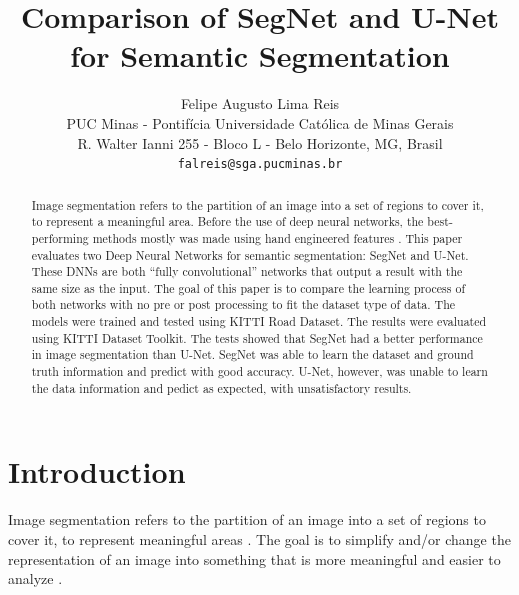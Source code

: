 \documentclass[10pt,twocolumn,letterpaper]{article}
\begin{document}
\title{Comparison of SegNet and U-Net for Semantic Segmentation}

\author{Felipe Augusto Lima Reis\\
PUC Minas - Pontif\'icia Universidade Cat\'olica de Minas Gerais\\
R. Walter Ianni 255 - Bloco L - Belo Horizonte, MG, Brasil\\
{\tt\small falreis@sga.pucminas.br}
}

\maketitle


\begin{abstract}
    Image segmentation refers to the partition of an image into a set of regions to cover it, to represent a meaningful area. Before the use of deep neural networks, the best-performing methods mostly was made using hand engineered features \cite{SEGNET}. This paper evaluates two Deep Neural Networks for semantic segmentation: SegNet and U-Net. These DNNs are both ``fully convolutional'' networks that output a result with the same size as the input. The goal of this paper is to compare the learning process of both networks with no pre or post processing to fit the dataset type of data. The models were trained and tested using KITTI Road Dataset. The results were evaluated using KITTI Dataset Toolkit. The tests showed that SegNet had a better performance in image segmentation than U-Net. SegNet was able to learn the dataset and ground truth information and predict with good accuracy. U-Net, however, was unable to learn the data information and pedict as expected, with unsatisfactory results.
\end{abstract}



\section{Introduction} \label{introduction}

Image segmentation refers to the partition of an image into a set of regions to cover it, to represent meaningful areas \cite{DOMINGUEZ}. The goal is to simplify and/or change the representation of an image into something that is more meaningful and easier to analyze \cite{AHMED_SARMA}.
\end{document}
